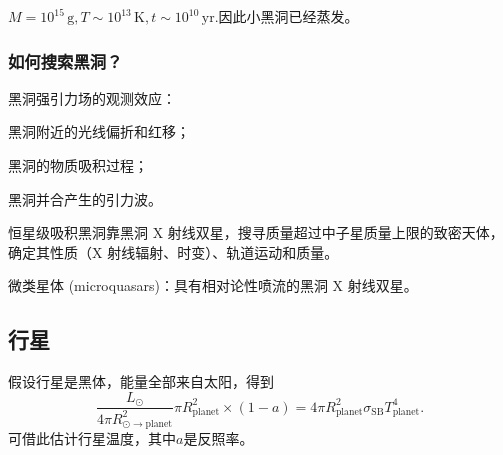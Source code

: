 \documentclass[../天体物理基础.tex]{subfiles}
\begin{document}
$M=10^{15}\,\mathrm{g},T\sim10^{13}\,\mathrm{K},t\sim10^{10}\,\mathrm{yr}$.因此小黑洞已经蒸发。

\subsubsection{如何搜索黑洞？}
黑洞强引力场的观测效应：

黑洞附近的光线偏折和红移；

黑洞的物质吸积过程；

黑洞并合产生的引力波。

恒星级吸积黑洞靠黑洞 X 射线双星，搜寻质量超过中子星质量上限的致密天体，确定其性质（X 射线辐射、时变）、轨道运动和质量。

微类星体 (microquasars)：具有相对论性喷流的黑洞 X 射线双星。


\subsection{行星}
假设行星是黑体，能量全部来自太阳，得到
\begin{equation}
\frac{L_{\odot}}{4\pi R^{2}_{\odot\to\text{planet}}}\pi R_{\text{planet}}^{2}\times\left(1-a\right)=4\pi R_{\text{planet}}^{2}\sigma_{\text{SB}}T_{\text{planet}}^{4}.
\end{equation}
可借此估计行星温度，其中$a$是反照率。

\printbibliography
\end{document}
